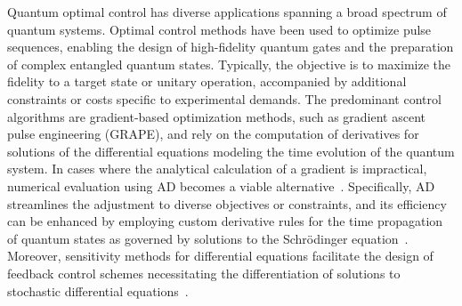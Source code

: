 Quantum optimal control has diverse applications spanning a broad spectrum of quantum systems. Optimal control methods have been used to optimize pulse sequences, enabling the design of high-fidelity quantum gates and the preparation of complex entangled quantum states. Typically, the objective is to maximize the fidelity to a target state or unitary operation, accompanied by additional constraints or costs specific to experimental demands. The predominant control algorithms are gradient-based optimization methods, such as gradient ascent pulse engineering (GRAPE), and rely on the computation of derivatives for solutions of the differential equations modeling the time evolution of the quantum system. In cases where the analytical calculation of a gradient is impractical, numerical evaluation using AD becomes a viable alternative~\cite{jirari:2009, leung:2017, abdelhafez:2019, jirari2019quantum, abdelhafez:2020, schaefer:2020, goerz:2022}. Specifically, AD streamlines the adjustment to diverse objectives or constraints, and its efficiency can be enhanced by employing custom derivative rules for the time propagation of quantum states as governed by solutions to the Schrödinger equation~\cite{goerz:2022}. Moreover, sensitivity methods for differential equations facilitate the design of feedback control schemes necessitating the differentiation of solutions to stochastic differential equations~\cite{schaefer:2021}.
